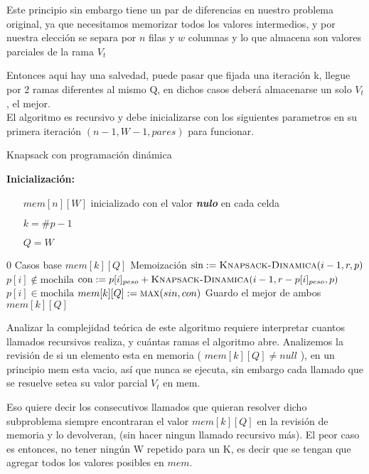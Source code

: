 \documentclass[fleqn, 11pt]{article}
\def\nulo{\textbf{\textit{nulo}}}
\begin{document}
Este principio sin embargo tiene un par de diferencias en nuestro problema original, ya que necesitamos memorizar todos los valores intermedios, y por nuestra elección se separa por $n$ filas y $w$ columnas y lo que almacena son valores parciales de la rama \textit{$V_t$}

Entonces aqui hay una salvedad, puede pasar que fijada una iteración k, llegue por 2 ramas diferentes al mismo Q,
en dichos casos deberá almacenarse un solo \textit{$V_t$}, el mejor. \\

El algoritmo es recursivo y debe inicializarse con los siguientes parametros en su primera iteración 
$(n-1, W-1, pares)$ para funcionar. 

\begin{algorithm}
\caption{Knapsack con programación dinámica}
\begin{algorithmic}[1]
\item[\textbf{Inicialización:}]
\item[] \begin{itemize}
	\item[] $mem[n][W]$ inicializado con el valor \nulo{} en cada celda
	\item[] $k = \#p - 1$
	\item[] $Q = W$
\end{itemize}
\Statex
{}
	\State \Return $0$
\Comment Casos base
\EndIf
	\If{$mem[k][Q] \neq \nulo$}
	\State	\Return $mem[k][Q]$
	\Comment Memoización
\EndIf
\State $\text{sin} := \Call{Knapsack-Dinamica}{i - 1, r, p}$
\Comment $p[i] \not \in \text{mochila}$
	\State $\text{con} := p[i]_{peso} + \Call{Knapsack-Dinamica}{i - 1, r - p[i]_{peso}, p}$
\Comment $p[i] \in \text{mochila}$
\State $mem[k][Q] := \Call{max}{sin, con}$
\Comment Guardo el mejor de ambos
\State \Return $mem[k][Q]$
\EndFunction
\end{algorithmic}
\end{algorithm}

Analizar la complejidad teórica de este algoritmo requiere interpretar cuantos llamados recursivos realiza, y cuántas ramas el algoritmo abre. Analizemos la revisión de si un elemento esta en memoria ( $mem[k][Q] \neq null$ ), en un principio mem esta vacio,  así que nunca se ejecuta, sin embargo cada llamado que se resuelve setea su valor parcial \textit{$V_t$} en mem.

Eso quiere decir los consecutivos llamados que quieran resolver dicho subproblema siempre encontraran el valor $mem[k][Q]$ en la revisión de memoria y lo devolveran, (sin hacer ningun llamado recursivo más). El peor caso es entonces, no tener ningún W repetido para un K, es decir que se tengan que agregar todos los valores posibles en $mem$.
\end{document}
